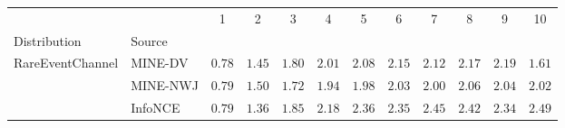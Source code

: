 \begin{tabular}{llcccccccccc}
\toprule
 &  & 1 & 2 & 3 & 4 & 5 & 6 & 7 & 8 & 9 & 10 \\
Distribution & Source &  &  &  &  &  &  &  &  &  &  \\
\midrule
\multirow[l]{3}{*}{RareEventChannel} & MINE-DV & $ 0.78 $ & $ 1.45 $ & $ 1.80 $ & $ 2.01 $ & $ 2.08 $ & $ 2.15 $ & $ 2.12 $ & $ 2.17 $ & $ 2.19 $ & $ 1.61 $ \\
 & MINE-NWJ & $ 0.79 $ & $ 1.50 $ & $ 1.72 $ & $ 1.94 $ & $ 1.98 $ & $ 2.03 $ & $ 2.00 $ & $ 2.06 $ & $ 2.04 $ & $ 2.02 $ \\
 & InfoNCE & $ 0.79 $ & $ 1.36 $ & $ 1.85 $ & $ 2.18 $ & $ 2.36 $ & $ 2.35 $ & $ 2.45 $ & $ 2.42 $ & $ 2.34 $ & $ 2.49 $ \\
\bottomrule
\end{tabular}
